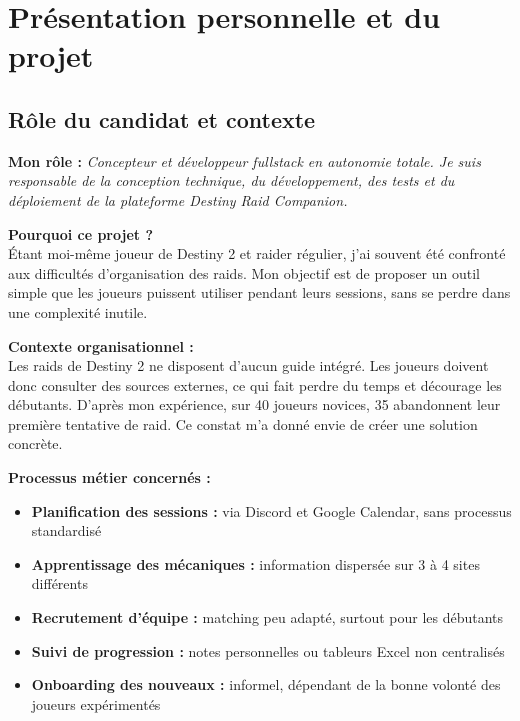 \chapter{Présentation personnelle et du projet}

\section{Rôle du candidat et contexte}

\textbf{Mon rôle :} \textit{Concepteur et développeur fullstack en autonomie totale. Je suis responsable de la conception technique, du développement, des tests et du déploiement de la plateforme Destiny Raid Companion.}

\vspace{0.5em}

\textbf{Pourquoi ce projet ?} \\
Étant moi-même joueur de Destiny 2 et raider régulier, j'ai souvent été confronté aux difficultés d'organisation des raids. Mon objectif est de proposer un outil simple que les joueurs puissent utiliser pendant leurs sessions, sans se perdre dans une complexité inutile.

\vspace{0.5em}

\textbf{Contexte organisationnel :} \\
Les raids de Destiny 2 ne disposent d'aucun guide intégré. Les joueurs doivent donc consulter des sources externes, ce qui fait perdre du temps et décourage les débutants. D'après mon expérience, sur 40 joueurs novices, 35 abandonnent leur première tentative de raid. Ce constat m'a donné envie de créer une solution concrète.

\vspace{0.5em}

\textbf{Processus métier concernés :}
\begin{itemize}
    \itemsep0.5em
    \item \textbf{Planification des sessions :} via Discord et Google Calendar, sans processus standardisé
    \item \textbf{Apprentissage des mécaniques :} information dispersée sur 3 à 4 sites différents
    \item \textbf{Recrutement d'équipe :} matching peu adapté, surtout pour les débutants
    \item \textbf{Suivi de progression :} notes personnelles ou tableurs Excel non centralisés
    \item \textbf{Onboarding des nouveaux :} informel, dépendant de la bonne volonté des joueurs expérimentés
\end{itemize}

